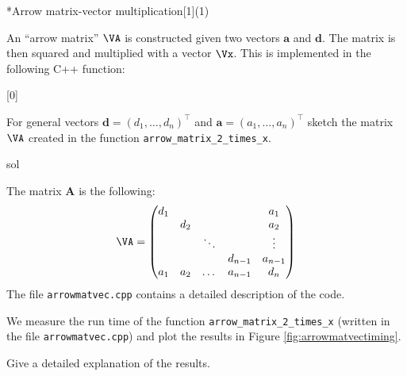 
\begin{samproblem}*{}{Arrow matrix-vector multiplication}[1](1){
    An ``arrow matrix'' $\VA$ is constructed given two vectors $\mathbf{a}$ and $\mathbf{d}$.
    The matrix is then squared and multiplied with a vector $\Vx$. This is implemented in the
    following C++ function:

[0]

}

\begin{subproblem}{}

  For general vectors $\mathbf{d} = (d_1, \dots, d_n)^\top$ and $\mathbf{a} = (a_1, \dots, a_n)^\top$
  sketch the matrix $\VA$ created in the function \texttt{arrow\_matrix\_2\_times\_x}.

  \begin{samwriteprbpart}{sol}
  \begin{samsolution}
    The matrix $\mathbf{A}$ is the following:
    \begin{align}
    \VA=\begin{pmatrix}
      d_1 &     &        &         & a_1     \\
          & d_2 &        &         & a_2     \\
          &     & \ddots &         & \vdots  \\
          &     &        & d_{n-1} & a_{n-1} \\
      a_1 & a_2 & \dots  & a_{n-1} & d_n     \\
    \end{pmatrix}
    \end{align}
    The file \texttt{arrowmatvec.cpp} contains a detailed description of the code.
  \end{samsolution}
\end{samwriteprbpart}
\end{subproblem}

\begin{subproblem}{}
  We measure the run time of the function \texttt{arrow\_matrix\_2\_times\_x} (written in the
  file \texttt{arrowmatvec.cpp})
  and plot the results in Figure \ref{fig:arrowmatvectiming}.

  Give a detailed explanation of the results.


\end{subproblem}
\end{samproblem}
